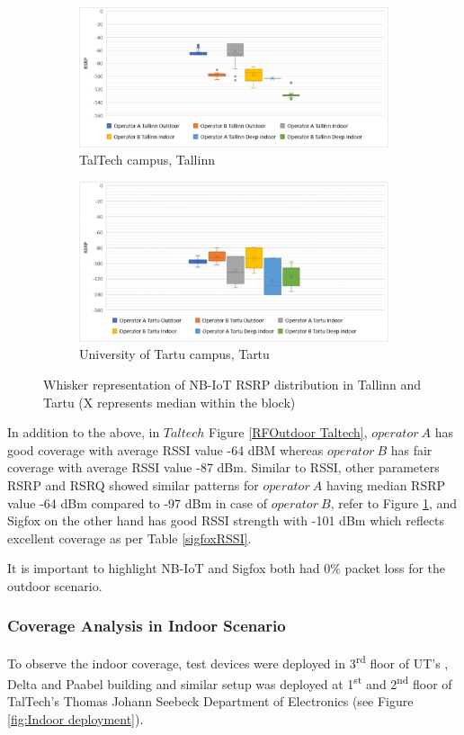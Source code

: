 \documentclass[12pt]{article}
\begin{document}
 \begin{figure}[H]
\begin{subfigure}[t]{\linewidth}
  \centering
  \includegraphics[width=.5\linewidth]{Images/tallinn/TallinnRSRPboxplot.pdf}  
  \caption{TalTech campus, Tallinn}
\end{subfigure}
\begin{subfigure}[t]{\linewidth}
  \centering
  \includegraphics[width=.5\linewidth]{Images/tartu/TartuRSRPboxplot.pdf}  
  \caption{University of Tartu campus, Tartu}
  
\end{subfigure}
\caption{Whisker representation of NB-IoT RSRP distribution in Tallinn and Tartu (X represents median within the block)}
 \label{boxplot}
\end{figure}






In addition to the above, in $Taltech$ Figure \ref{RFOutdoor Taltech}, $operator\ A$ has good coverage with average RSSI value -64 dBM whereas $operator\ B$ has fair coverage with average RSSI value -87 dBm. Similar to RSSI, other parameters RSRP and RSRQ showed similar patterns for $operator\ A$ having median RSRP value -64 dBm compared to -97 dBm in case of $operator\ B$, refer to Figure \ref{boxplot}, and Sigfox on the other hand has good RSSI strength with -101 dBm which reflects excellent coverage as per Table \ref{sigfoxRSSI}.\par
It is important to highlight NB-IoT and Sigfox both had 0\% packet loss for the outdoor scenario.




\subsubsection{Coverage Analysis in Indoor Scenario}\label{indoor analysis}
To observe the indoor coverage, test devices were deployed in 3\textsuperscript{rd} floor of UT's , Delta and Paabel building and similar setup was deployed at 1\textsuperscript{st} and 2\textsuperscript{nd} floor of TalTech's Thomas Johann Seebeck Department of Electronics (see Figure \ref{fig:Indoor deployment}).
\end{document}
